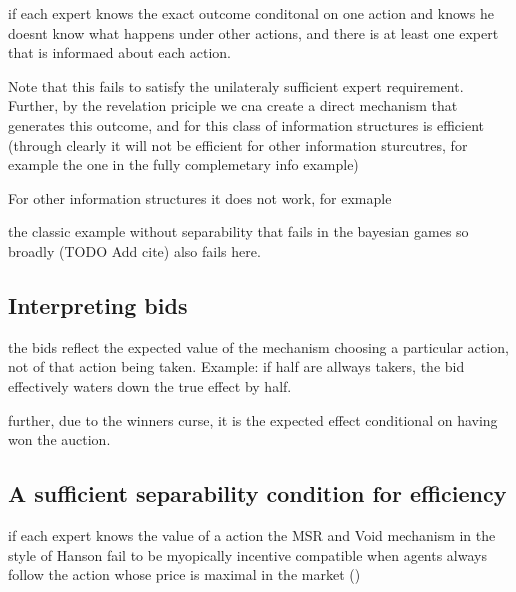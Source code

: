 \begin{lem}
	if each expert knows the exact outcome conditonal on one action and knows he doesnt know what happens under other actions, and there is at least one expert that is informaed about each action.
\end{lem}

Note that this fails to satisfy the unilateraly sufficient expert requirement. Further, by the revelation priciple we cna create a direct mechanism that generates this outcome, and for this class of information structures is efficient (through clearly it will not be efficient for other information sturcutres, for example the one in the fully complemetary info example)

For other information structures it does not work, for exmaple 
\begin{eg}
	the classic example without separability that fails in the bayesian games so broadly (TODO Add cite) also fails here. 
\end{eg}


\subsection{Interpreting bids}

the bids reflect the expected value of the mechanism choosing a particular action, not of that action being taken.  Example: if half are allways takers, the bid effectively waters down the true effect by half.

further, due to the winners curse, it is the expected effect conditional on having won the auction. 


\subsection{A sufficient separability condition for efficiency}

if each expert knows the value of a action the MSR and Void mechanism in the style of Hanson fail to be myopically incentive compatible when agents always follow the action whose price is maximal in the market (\cite{othman2010decision})


